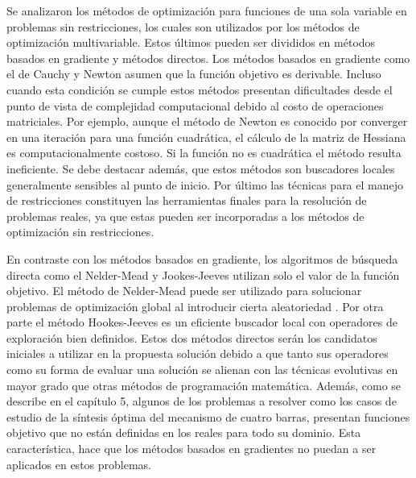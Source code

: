 Se analizaron los métodos de optimización para funciones de una sola variable en problemas sin restricciones, los cuales son utilizados por los métodos de optimización multivariable. Estos últimos pueden ser divididos en métodos basados en gradiente y métodos directos. Los métodos basados en gradiente como el de Cauchy y Newton asumen que la función objetivo es derivable. Incluso cuando esta condición se cumple estos métodos presentan dificultades desde el punto de vista de complejidad computacional debido al costo de operaciones matriciales. Por ejemplo, aunque el método de Newton es conocido por converger en una iteración para una función cuadrática, el cálculo de la matriz de Hessiana es computacionalmente costoso. Si la función no es cuadrática el método resulta ineficiente. Se debe destacar además, que estos métodos son buscadores locales generalmente sensibles al punto de inicio. Por último las técnicas para el manejo de restricciones constituyen las herramientas finales para la resolución de problemas reales,  ya que estas pueden ser incorporadas a los métodos de optimización sin restricciones.

En contraste con los métodos basados en gradiente, los algoritmos de búsqueda directa como el Nelder-Mead y Jookes-Jeeves utilizan solo el valor de la función objetivo. El método de Nelder-Mead puede ser utilizado para solucionar problemas de optimización global al introducir cierta aleatoriedad \cite{belegundu_optimization_2011}. Por otra parte el método Hookes-Jeeves es un eficiente buscador local con operadores de exploración bien definidos. Estos dos métodos directos serán los candidatos iniciales a utilizar en la propuesta solución debido a que tanto sus operadores como su forma de evaluar una solución se alienan con las técnicas evolutivas en mayor grado que otras métodos de programación matemática. Además, como se describe en el capítulo 5, algunos de los problemas a resolver como los casos de estudio de la síntesis óptima del mecanismo de cuatro barras, presentan funciones objetivo que no están definidas en los reales para todo su dominio. Esta característica, hace que los métodos basados en gradientes no puedan a ser aplicados en estos problemas. 